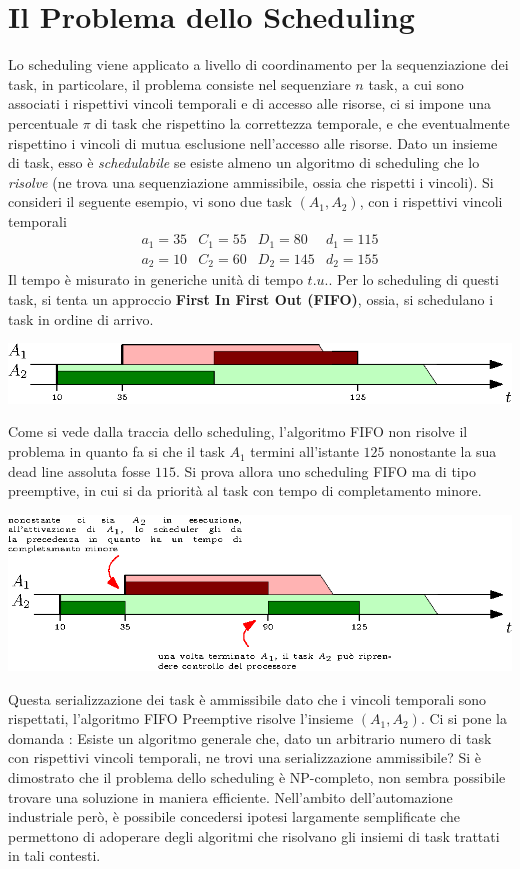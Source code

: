 \documentclass[10pt, letterpaper]{report}
\begin{document}
\section{Il Problema dello Scheduling}
Lo scheduling viene applicato a livello di coordinamento per la sequenziazione dei task, 
in particolare, il problema consiste nel sequenziare $n$ task, a cui sono associati i rispettivi 
vincoli temporali e di accesso alle risorse, ci si impone una percentuale $\pi$ di task che 
rispettino la correttezza temporale, e che eventualmente rispettino i vincoli di mutua 
esclusione nell'accesso alle risorse.\acc 
{} Dato un insieme di task, esso è \textit{schedulabile} se esiste almeno un algoritmo 
di scheduling che lo \textit{risolve} (ne trova una sequenziazione ammissibile, ossia che 
rispetti i vincoli).\acc
Si consideri il seguente esempio, vi sono due task $(A_1,A_2)$, con i rispettivi vincoli 
temporali
$$\begin{matrix}
    a_1=35 & C_1=55 & D_1=80&d_1=115\\ 
    a_2=10 & C_2=60 & D_2=145&d_2=155
\end{matrix}$$
Il tempo è misurato in generiche unità di tempo $t.u.$. Per lo scheduling di questi task, si tenta un 
approccio \textbf{First In First Out (FIFO)}, ossia, si schedulano i task in ordine di 
arrivo.\begin{center}
    \includegraphics[width=1\textwidth ]{images/esempioFIFO.eps}
\end{center}
Come si vede dalla traccia dello scheduling, l'algoritmo FIFO non risolve il problema in quanto fa 
si che il task $A_1$ termini all'istante $125$ nonostante la sua dead line assoluta fosse $115$. Si prova 
allora uno scheduling FIFO ma di tipo preemptive, in cui si da priorità al task con tempo di completamento 
minore.\begin{center}
    \includegraphics[width=1\textwidth ]{images/esempioFIFOPreemptive.eps}
\end{center}
Questa serializzazione dei task è ammissibile dato che i vincoli temporali sono rispettati, l'algoritmo 
FIFO Preemptive risolve l'insieme $(A_1,A_2)$.\acc 
Ci si pone la domanda : Esiste un algoritmo generale che, dato un arbitrario numero di task con 
rispettivi vincoli temporali, ne trovi una serializzazione ammissibile? Si è dimostrato che il problema 
dello scheduling è NP-completo, non sembra possibile trovare una soluzione in maniera efficiente. Nell'ambito dell'automazione 
industriale però, è possibile concedersi ipotesi largamente semplificate che permettono di 
adoperare degli algoritmi che risolvano gli insiemi di task trattati in tali contesti.
\end{document}
